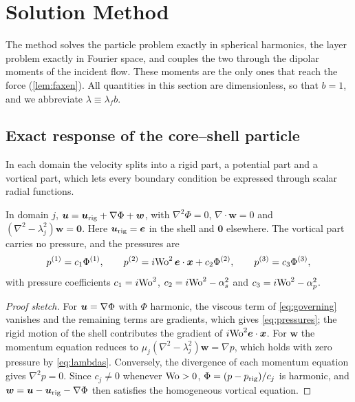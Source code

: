 \section{Solution Method}\label{sec:analysis}

The method solves the particle problem exactly in spherical harmonics, the layer problem exactly in Fourier space, and
couples the two through the dipolar moments of the incident flow. These moments are the only ones that reach the
force (\cref{lem:faxen}). All quantities in this section are dimensionless, so that $b=1$, and we abbreviate
$\lambda\equiv\lambda_fb$.

\subsection{Exact response of the core--shell particle}\label{sec:sphere}
In each domain the velocity splits into a rigid part, a potential part and a vortical part, which lets every boundary
condition be expressed through scalar radial functions.

\begin{lemma}\label{lem:decomp}
In domain $j$, $\bm{u}=\bm{u}_{\rm rig}+\nabla\Phi+\bm w$, with $\nabla^2\Phi=0$, $\nabla\cdot\bm w=0$ and
$(\nabla^2-\lambda_j^2)\bm w=\bm 0$. Here $\bm{u}_{\rm rig}=\bm{e}$ in the shell and $\bm 0$ elsewhere. The vortical part
carries no pressure, and the pressures are
\begin{equation}
  p^{(1)}=c_1\Phi^{(1)},\qquad p^{(2)}=i\mathrm{Wo}^2\,\bm{e}\cdot\bm{x}+c_2\Phi^{(2)},\qquad p^{(3)}=c_3\Phi^{(3)},
  \label{eq:pressures}
\end{equation}
with pressure coefficients $c_1=i\mathrm{Wo}^2$, $c_2=i\mathrm{Wo}^2-\alpha_s^2$ and $c_3=i\mathrm{Wo}^2-\alpha_p^2$.
\end{lemma}
\begin{proof}[Proof sketch]
For $\bm{u}=\nabla\Phi$ with $\Phi$ harmonic, the viscous term of \cref{eq:governing} vanishes and the remaining terms are
gradients, which gives \cref{eq:pressures}; the rigid motion of the shell contributes the gradient of
$i\mathrm{Wo}^2\bm{e}\cdot\bm{x}$. For $\bm w$ the momentum equation reduces to $\mu_j(\nabla^2-\lambda_j^2)\bm w=\nabla p$, which
holds with zero pressure by \cref{eq:lambdas}. Conversely, the divergence of each momentum equation gives
$\nabla^2p=0$. Since $c_j\neq0$ whenever $\mathrm{Wo}>0$, $\Phi=(p-p_{\rm rig})/c_j$ is harmonic, and
$\bm w=\bm{u}-\bm{u}_{\rm rig}-\nabla\Phi$ then satisfies the homogeneous vortical equation.
\end{proof}

